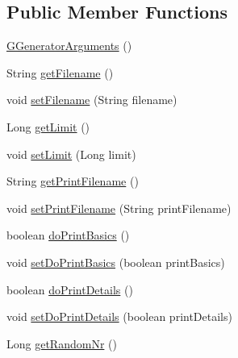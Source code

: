 \subsection*{Public Member Functions}
\begin{DoxyCompactItemize}
\item 
\hyperlink{classorg_1_1tzi_1_1use_1_1gen_1_1tool_1_1_g_generator_arguments_a5b62d6325822b7427749fd7a1edb00fd}{G\-Generator\-Arguments} ()
\item 
String \hyperlink{classorg_1_1tzi_1_1use_1_1gen_1_1tool_1_1_g_generator_arguments_ad3390124383574333d38b7b04f825d4c}{get\-Filename} ()
\item 
void \hyperlink{classorg_1_1tzi_1_1use_1_1gen_1_1tool_1_1_g_generator_arguments_a90dddd50daeaf9152c8b627738c259d9}{set\-Filename} (String filename)
\item 
Long \hyperlink{classorg_1_1tzi_1_1use_1_1gen_1_1tool_1_1_g_generator_arguments_a1786bb60337a000294f4fd499dfb22bd}{get\-Limit} ()
\item 
void \hyperlink{classorg_1_1tzi_1_1use_1_1gen_1_1tool_1_1_g_generator_arguments_ae2346afbc3b72e53993459c64bdd5ecf}{set\-Limit} (Long limit)
\item 
String \hyperlink{classorg_1_1tzi_1_1use_1_1gen_1_1tool_1_1_g_generator_arguments_ac8fdb33939580568c9ccd64cad94326c}{get\-Print\-Filename} ()
\item 
void \hyperlink{classorg_1_1tzi_1_1use_1_1gen_1_1tool_1_1_g_generator_arguments_a9c1e54e7701ff928efcab8aa86081fec}{set\-Print\-Filename} (String print\-Filename)
\item 
boolean \hyperlink{classorg_1_1tzi_1_1use_1_1gen_1_1tool_1_1_g_generator_arguments_a03b2937f2c35f5da6c7df3e0bed42c38}{do\-Print\-Basics} ()
\item 
void \hyperlink{classorg_1_1tzi_1_1use_1_1gen_1_1tool_1_1_g_generator_arguments_aa81a24fb0c25a367d5a58451a854b507}{set\-Do\-Print\-Basics} (boolean print\-Basics)
\item 
boolean \hyperlink{classorg_1_1tzi_1_1use_1_1gen_1_1tool_1_1_g_generator_arguments_a4586ec74b328e4504f97d917d9a12664}{do\-Print\-Details} ()
\item 
void \hyperlink{classorg_1_1tzi_1_1use_1_1gen_1_1tool_1_1_g_generator_arguments_a0211ab5cb08c352cf6f7ef1e60e04980}{set\-Do\-Print\-Details} (boolean print\-Details)
\item 
Long \hyperlink{classorg_1_1tzi_1_1use_1_1gen_1_1tool_1_1_g_generator_arguments_a5309062c9774c478bf4ccc47513c046c}{get\-Random\-Nr} ()
\item 

\end{DoxyCompactItemize}
